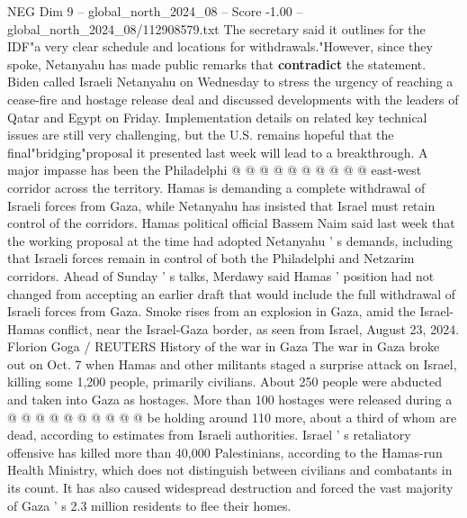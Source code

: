 \begin{textsample}{NEG Dim 9 – global\_north\_2024\_08 – Score -1.00 – global\_north\_2024\_08/112908579.txt}
The secretary said it outlines for the IDF"a very clear schedule and locations for withdrawals."However, since they spoke, Netanyahu has made public remarks that \textbf{contradict} the statement.
Biden called Israeli Netanyahu on Wednesday to stress the urgency of reaching a cease-fire and hostage release deal and discussed developments with the leaders of Qatar and Egypt on Friday.
Implementation details on related key technical issues are still very challenging, but the U.S. remains hopeful that the final"bridging"proposal it presented last week will lead to a breakthrough.
A major impasse has been the Philadelphi @ @ @ @ @ @ @ @ @ @ east-west corridor across the territory.
Hamas is demanding a complete withdrawal of Israeli forces from Gaza, while Netanyahu has insisted that Israel must retain control of the corridors.
Hamas political official Bassem Naim said last week that the working proposal at the time had adopted Netanyahu ' s demands, including that Israeli forces remain in control of both the Philadelphi and Netzarim corridors.
Ahead of Sunday ' s talks, Merdawy said Hamas ' position had not changed from accepting an earlier draft that would include the full withdrawal of Israeli forces from Gaza.
Smoke rises from an explosion in Gaza, amid the Israel-Hamas conflict, near the Israel-Gaza border, as seen from Israel, August 23, 2024.
Florion Goga / REUTERS History of the war in Gaza The war in Gaza broke out on Oct. 7 when Hamas and other militants staged a surprise attack on Israel, killing some 1,200 people, primarily civilians.
About 250 people were abducted and taken into Gaza as hostages.
More than 100 hostages were released during a @ @ @ @ @ @ @ @ @ @ be holding around 110 more, about a third of whom are dead, according to estimates from Israeli authorities.
Israel ' s retaliatory offensive has killed more than 40,000 Palestinians, according to the Hamas-run Health Ministry, which does not distinguish between civilians and combatants in its count.
It has also caused widespread destruction and forced the vast majority of Gaza ' s 2.3 million residents to flee their homes.

\end{textsample}
